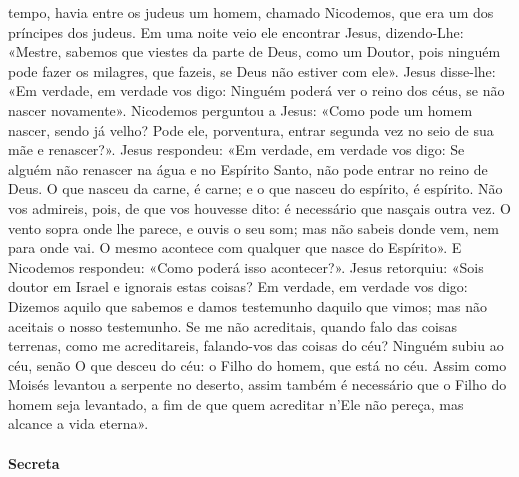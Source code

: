 \begin{paracol}{2}
{ tempo, havia entre os judeus um homem, chamado Nicodemos, que era um dos príncipes dos judeus. Em uma noite veio ele encontrar Jesus, dizendo-Lhe: «Mestre, sabemos que viestes da parte de Deus, como um Doutor, pois ninguém pode fazer os milagres, que fazeis, se Deus não estiver com ele». Jesus disse-lhe: «Em verdade, em verdade vos digo: Ninguém poderá ver o reino dos céus, se não nascer novamente». Nicodemos perguntou a Jesus: «Como pode um homem nascer, sendo já velho? Pode ele, porventura, entrar segunda vez no seio de sua mãe e renascer?». Jesus respondeu: «Em verdade, em verdade vos digo: Se alguém não renascer na água e no Espírito Santo, não pode entrar no reino de Deus. O que nasceu da carne, é carne; e o que nasceu do espírito, é espírito. Não vos admireis, pois, de que vos houvesse dito: é necessário que nasçais outra vez. O vento sopra onde lhe parece, e ouvis o seu som; mas não sabeis donde vem, nem para onde vai. O mesmo acontece com qualquer que nasce do Espírito». E Nicodemos respondeu: «Como poderá isso acontecer?». Jesus retorquiu: «Sois doutor em Israel e ignorais estas coisas? Em verdade, em verdade vos digo: Dizemos aquilo que sabemos e damos testemunho daquilo que vimos; mas não aceitais o nosso testemunho. Se me não acreditais, quando falo das coisas terrenas, como me acreditareis, falando-vos das coisas do céu? Ninguém subiu ao céu, senão O que desceu do céu: o Filho do homem, que está no céu. Assim como Moisés levantou a serpente no deserto, assim também é necessário que o Filho do homem seja levantado, a fim de que quem acreditar n’Ele não pereça, mas alcance a vida eterna».
}\end{paracol}

\begin{paracol}{2}\switchcolumn{}\end{paracol}

\paragraph{Secreta}
\begin{paracol}{2}\switchcolumn{}\end{paracol}

